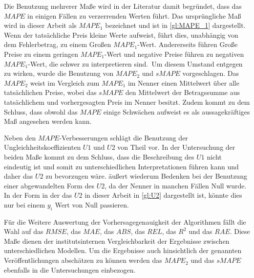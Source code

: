 Die Benutzung mehrerer Maße wird in der Literatur damit begründet, dass das $MAPE$ in einigen Fällen zu verzerrenden Werten führt. Das ursprüngliche Maß wird in dieser Arbeit als $MAPE_1$ bezeichnet und ist in \autoref{gl:MAPE_1} dargestellt. Wenn der tatsächliche Preis kleine Werte aufweist, führt dies, unabhängig von dem Fehlerbetrag, zu einem Großen $MAPE_1$-Wert. Andererseits führen Große Preise zu einem geringen $MAPE_1$-Wert und negative Preise führen zu negativen $MAPE_1$-Wert, die schwer zu interpretieren sind.\, Um diesem Umstand entgegen zu wirken, wurde die Benutzung von $MAPE_2$ und $sMAPE$ vorgeschlagen. Das $MAPE_2$ weist im Vergleich zum $MAPE_1$ im Nenner einen Mittelwert über alle tatsächlichen Preise, wobei das $sMAPE$ den Mittelwert der Betragssumme aus tatsächlichem und vorhergesagten Preis im Nenner besitzt. Zudem kommt \citet{Makridakis1993} zu dem Schluss, dass obwohl das $MAPE$ einige Schwächen aufweist es als aussagekräftiges Maß angesehen werden kann.

Neben den $MAPE$-Verbesserungen schlägt \citet{Panapakidis2016} die Benutzung der Ungleichheitskoeffizienten $U1$ und $U2$ von Theil vor. In der Untersuchung der beiden Maße kommt \citet{Bliemel1973} zu dem Schluss, dass die Beschreibung des $U1$ nicht eindeutig ist und somit zu unterschiedlichen Interpretationen führen kann und daher das $U2$ zu bevorzugen wäre. \citet{Makridakis1993} äußert wiederum Bedenken bei der Benutzung einer abgewandelten Form des $U2$, da der Nenner in manchen Fällen Null wurde. In der Form in der das $U2$ in dieser Arbeit in \autoref{gl:U2} dargestellt ist, könnte dies nur bei einem $y_i$ Wert von Null passieren.

Für die Weitere Auswertung der Vorhersagegenauigkeit der Algorithmen fällt die Wahl auf das $RMSE$, das $MAE$, das $ABS$, das $REL$, das $R^2$ und das $RAE$. Diese Maße dienen der institutsinternen Vergleichbarkeit der Ergebnisse zwischen unterschiedlichen Modellen. Um die Ergebnisse auch hinsichtlich der genannten Veröffentlichungen abschätzen zu können werden das $MAPE_2$ und das $sMAPE$ ebenfalls in die Untersuchungen einbezogen.


